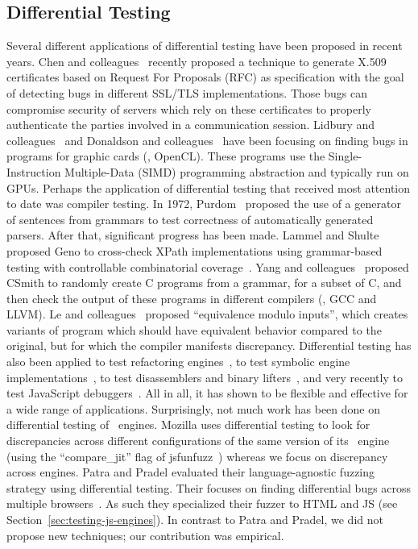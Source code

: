 \documentclass[smallextended]{svjour3}
\begin{document}
\subsection{Differential Testing}
Several different applications of differential testing have been
proposed in recent years. Chen and
colleagues~\cite{Chen:2018:RDT:3180155.3180226} recently proposed a
technique to generate X.509 certificates based on Request For
Proposals (RFC) as specification with the goal of detecting bugs in
different SSL/TLS implementations. Those bugs can compromise security
of servers which rely on these certificates to properly authenticate
the parties involved in a communication session. Lidbury and
colleagues~\cite{Lidbury:2015:MCF:2737924.2737986} and Donaldson and
colleagues~\cite{Donaldson:2017:ATG:3152284.3133917} have been
focusing on finding bugs in programs for graphic cards (\eg{},
OpenCL). These programs use the Single-Instruction Multiple-Data
(SIMD) programming abstraction and typically run on GPUs.  Perhaps the
application of differential testing that received most attention to
date was compiler testing. In 1972, Purdom~\cite{Purdom1972} proposed
the use of a generator of sentences from grammars to test correctness
of automatically generated parsers. After that, significant progress
has been made. Lammel and Shulte proposed Geno to cross-check XPath
implementations using grammar-based testing with controllable
combinatorial coverage~\cite{10.1007/11754008_2}. Yang and
colleagues~\cite{Yang:2011:FUB:1993498.1993532} proposed CSmith to
randomly create C programs from a grammar, for a subset of C, and then
check the output of these programs in different compilers (\eg{}, GCC
and LLVM). Le and colleagues~\cite{Le:2014:CVV:2594291.2594334}
proposed ``equivalence modulo inputs'', which creates variants of
program which should have equivalent behavior compared to the
original, but for which the compiler manifests
discrepancy. Differential testing has also been applied to test
refactoring engines~\cite{Daniel:2007:ATR:1287624.1287651}, to test
symbolic engine implementations~\cite{Kapus:2017:ATS:3155562.3155636},
to test disassemblers and binary
lifters~\cite{Paleari:2010:NDD:1831708.1831741,Kim:2017:TIR:3155562.3155609},
and very recently to test JavaScript
debuggers~\cite{DBLP:conf/sigsoft/LehmannP18}. All in all, it has
shown to be flexible and effective for a wide range of
applications. Surprisingly, not much work has been done on
differential testing of \js\ engines. Mozilla uses differential
testing to look for discrepancies across different configurations of
the same version of its \smonkey\ engine (using the ``compare\_jit''
flag of jsfunfuzz~\cite{jsfunfuzz}) whereas we focus on discrepancy
across engines. Patra and Pradel evaluated their language-agnostic
fuzzing strategy using differential testing. Their focuses on finding
differential bugs across multiple
browsers~\cite{patra2016learning}. As such they specialized their
fuzzer to HTML and JS (see Section~\ref{sec:testing-js-engines}). In
contrast to Patra and Pradel, we did not propose new techniques; our
contribution was empirical.
\end{document}

